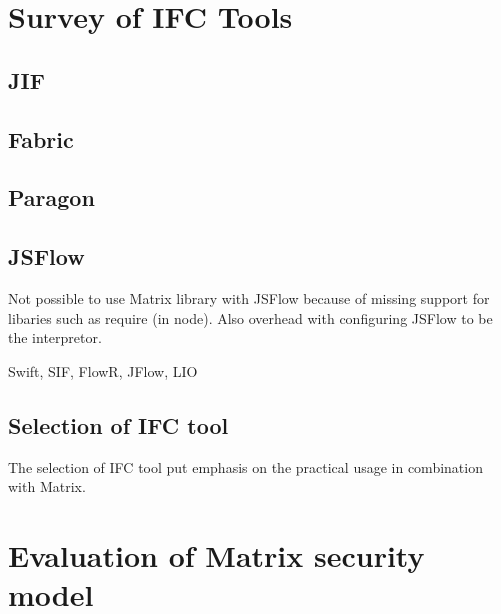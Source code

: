 \section{Survey of IFC Tools}

\subsection{JIF}

\subsection{Fabric}

\subsection{Paragon}

\subsection{JSFlow}
Not possible to use Matrix library with JSFlow because of missing support for libaries such as require (in node). Also overhead with configuring JSFlow to be the interpretor.

Swift, SIF, FlowR, JFlow, LIO


\subsection{Selection of IFC tool}
The selection of IFC tool put emphasis on the practical usage in combination with Matrix. 

\section{Evaluation of Matrix security model}



